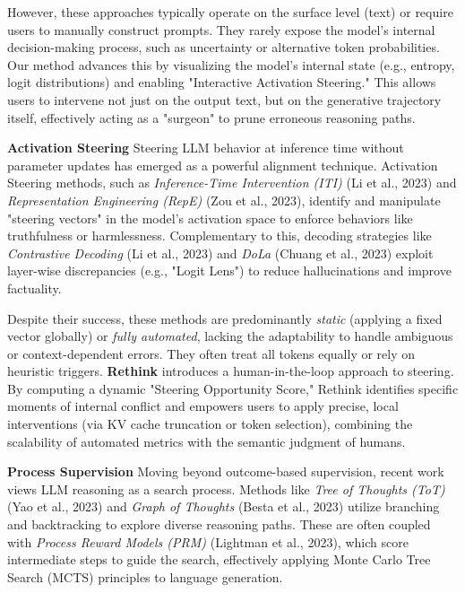 \documentclass{article}
\begin{document}
However, these approaches typically operate on the surface level (text) or require users to manually construct prompts. They rarely expose the model's internal decision-making process, such as uncertainty or alternative token probabilities. Our method advances this by visualizing the model's internal state (e.g., entropy, logit distributions) and enabling "Interactive Activation Steering." This allows users to intervene not just on the output text, but on the generative trajectory itself, effectively acting as a "surgeon" to prune erroneous reasoning paths.

\noindent \textbf{Activation Steering} \hspace{1mm}
Steering LLM behavior at inference time without parameter updates has emerged as a powerful alignment technique. Activation Steering methods, such as \textit{Inference-Time Intervention (ITI)} (Li et al., 2023) and \textit{Representation Engineering (RepE)} (Zou et al., 2023), identify and manipulate "steering vectors" in the model's activation space to enforce behaviors like truthfulness or harmlessness. Complementary to this, decoding strategies like \textit{Contrastive Decoding} (Li et al., 2023) and \textit{DoLa} (Chuang et al., 2023) exploit layer-wise discrepancies (e.g., "Logit Lens") to reduce hallucinations and improve factuality.

Despite their success, these methods are predominantly \textit{static} (applying a fixed vector globally) or \textit{fully automated}, lacking the adaptability to handle ambiguous or context-dependent errors. They often treat all tokens equally or rely on heuristic triggers. \textbf{Rethink} introduces a human-in-the-loop approach to steering. By computing a dynamic "Steering Opportunity Score," Rethink identifies specific moments of internal conflict and empowers users to apply precise, local interventions (via KV cache truncation or token selection), combining the scalability of automated metrics with the semantic judgment of humans.

\noindent \textbf{Process Supervision} \hspace{1mm}
Moving beyond outcome-based supervision, recent work views LLM reasoning as a search process. Methods like \textit{Tree of Thoughts (ToT)} (Yao et al., 2023) and \textit{Graph of Thoughts} (Besta et al., 2023) utilize branching and backtracking to explore diverse reasoning paths. These are often coupled with \textit{Process Reward Models (PRM)} (Lightman et al., 2023), which score intermediate steps to guide the search, effectively applying Monte Carlo Tree Search (MCTS) principles to language generation.
\end{document}
